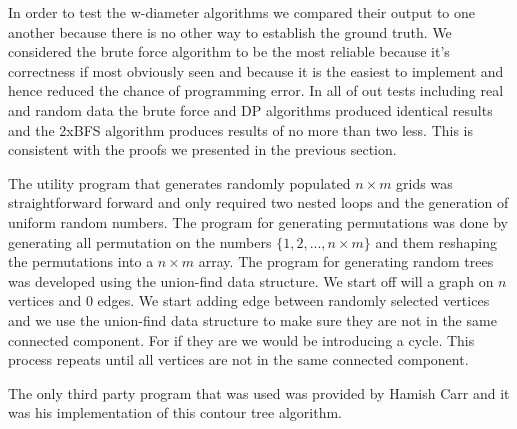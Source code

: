 In order to test the w-diameter algorithms we compared their output to one another because there is no other way to establish the ground truth. We considered the brute force algorithm to be the most reliable because it's correctness if most obviously seen and because it is the easiest to implement and hence reduced the chance of programming error. In all of out tests including real and random data the brute force and DP algorithms produced identical results and the 2xBFS algorithm produces results of no more than two less. This is consistent with the proofs we presented in the previous section.

The utility program that generates randomly populated $n \times m$ grids was straightforward forward and only required two nested loops and the generation of uniform random numbers. The program for generating permutations was done by generating all permutation on the numbers $\{1, 2, ..., n \times m\}$ and them reshaping the permutations into a $n \times m$ array. The program for generating random trees was developed using the union-find data structure. We start off will a graph on $n$ vertices and $0$ edges. We start adding edge between randomly selected vertices and we use the union-find data structure to make sure they are not in the same connected component. For if they are we would be introducing a cycle. This process repeats until all vertices are not in the same connected component.

The only third party program that was used was provided by Hamish Carr and it was his implementation of this contour tree algorithm. 





